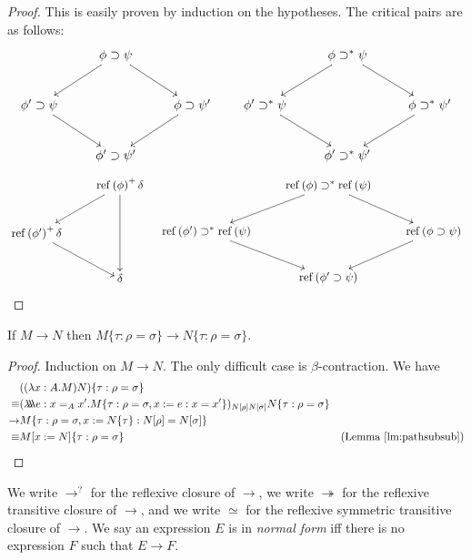 \documentclass[a4paper,UKenglish]{lipics-v2016}
\newcommand*{\reff}[1]{\ensuremath{\mathrm{ref} \left( {#1} \right)}}
\newcommand*{\triplelambda}{\ensuremath{\lambda \!\! \lambda \!\! \lambda}}
\theoremstyle{plain}
\theoremstyle{definition}
\begin{document}
\begin{proof}
This is easily proven by induction on the hypotheses.  The critical pairs are as follows:
$$ \xymatrix{
& \phi \supset \psi \ar[dl] \ar[dr] \\
\phi' \supset \psi \ar[dr] & & \phi \supset \psi' \ar[dl] \\
& \phi' \supset \psi' } \qquad
\xymatrix{
& \phi \supset^* \psi \ar[dl] \ar[dr] \\
\phi' \supset^* \psi \ar[dr] & & \phi \supset^* \psi' \ar[dl] \\
& \phi' \supset^* \psi' } $$
$$ \xymatrix{
& \reff{\phi}^+ \delta \ar[dl] \ar[dd] \\
\reff{\phi'}^+ \delta \ar[dr] \\
& \delta} \quad
\xymatrix{
& \reff{\phi} \supset^* \reff{\psi} \ar[dl] \ar[dr] \\
\reff{\phi'} \supset^* \reff{\psi} \ar[dr] & & \reff{\phi \supset \psi} \ar[dl] \\
& \reff{\phi' \supset \psi} }$$
\end{proof}

\begin{lemma}
\label{lm:resp-sub}
If $M \rightarrow N$ then $M \{ \tau : \rho = \sigma \} \rightarrow N \{ \tau : \rho = \sigma \}$.
\end{lemma}

\begin{proof}
Induction on $M \rightarrow N$.  The only difficult case is $\beta$-contraction.  We have
\begin{align*}
& ((\lambda x:A.M)N)\{ \tau : \rho = \sigma \} \\
\equiv & (\triplelambda e : x =_A x' . M \{ \tau : \rho = \sigma, x := e : x = x' \})_{N [ \rho ] N [ \sigma ]} N \{ \tau : \rho = \sigma \} \\
\rightarrow & M \{ \tau : \rho = \sigma, x := N \{ \tau \} : N [ \rho ] = N [ \sigma ] \} \\
\equiv & M [ x := N ] \{ \tau : \rho = \sigma \} & (\text{Lemma \ref{lm:pathsubsub}})
\end{align*}
\end{proof}

We write $\rightarrow^?$ for the reflexive closure of $\rightarrow$, 
we write $\twoheadrightarrow$ for the reflexive transitive closure of $\rightarrow$, and we write $\simeq$ for the reflexive symmetric transitive closure of $\rightarrow$.
We say an expression $E$ is in \emph{normal form} iff there is no expression $F$ such that $E \rightarrow F$.
\end{document}
